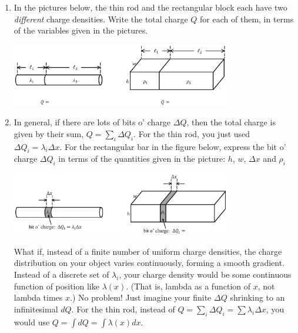 \begin{enumerate}[labparts]
\item In the pictures below, the thin rod and the rectangular block each have two \textit{different} charge densities.  Write the total charge $Q$ for each of them, in terms of the variables given in the pictures.
\begin{center}
\includegraphics[width=0.75\textwidth]{charge_density/fig1.eps}
\end{center}

\item In general, if there are lots of bits o' charge $\Delta Q$, then the total charge is given by their sum, $Q = \sum_i \Delta Q_i$. For the thin rod, you just used $\Delta Q_i = \lambda_i \Delta x$.  For the rectangular bar in the figure below, express the bit o' charge $\Delta Q_i$ in terms of the quantities given in the picture: $h$, $w$, $\Delta x$ and $\rho_i$

\vspace{-0.4 in}
\begin{center}
\includegraphics[width=0.75\textwidth]{charge_density/fig2.eps}
\vspace{-0.2in}
\end{center}
What if, instead of a finite number of uniform charge densities, the charge distribution on your object varies continuously, forming a smooth gradient. Instead of a discrete set of $\lambda_i$, your charge density would be some continuous function of position like $\lambda(x)$.  (That is, lambda as a function of $x$, not lambda times $x$.) No problem! Just imagine your finite $\Delta Q$ shrinking to an infinitesimal $dQ$.  For the thin rod, instead of $Q= \sum_i \Delta Q_i = \sum \lambda_i \Delta x$, you would use $Q = \int dQ = \int \lambda \left(x\right) dx$. 


\end{enumerate}
